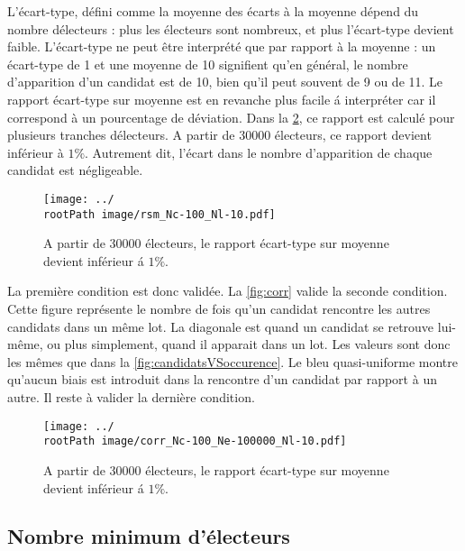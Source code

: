 \documentclass[conference]{IEEEtran}
\newcommand*{\rootPath}{../}
\begin{document}
L'\'ecart-type, d\'efini comme la moyenne des \'ecarts \`a la moyenne d\'epend du nombre d\'electeurs : plus les \'electeurs sont nombreux, et plus l'\'ecart-type devient faible. L'\'ecart-type ne peut \^etre interpr\'et\'e que par rapport \`a la moyenne : un \'ecart-type de 1 et une moyenne de 10 signifient qu'en g\'en\'eral, le nombre d'apparition d'un candidat est de 10, bien qu'il peut souvent de 9 ou de 11. Le rapport \'ecart-type sur moyenne est en revanche plus facile \'a interpr\'eter car il correspond \`a un pourcentage de d\'eviation. Dans la \cref{fig:rem}, ce rapport est calcul\'e pour plusieurs tranches d\'electeurs. A partir de 30000 \'electeurs, ce rapport devient inf\'erieur \`a $1\%$. Autrement dit, l'\'ecart dans le nombre d'apparition de chaque candidat est n\'egligeable.


\begin{figure}[!ht]
  \centering
  \texttt{[image: ../\\rootPath image/rsm\_Nc-100\_Nl-10.pdf]}
  \caption{A partir de 30000 \'electeurs, le rapport \'ecart-type sur moyenne devient inf\'erieur \'a $1\%$.}
  \label{fig:rem}
\end{figure}

La premi\`ere condition est donc valid\'ee. La \cref{fig:corr} valide la seconde condition. Cette figure repr\'esente le nombre de fois qu'un candidat rencontre les autres candidats dans un m\^eme lot. La diagonale est quand un candidat se retrouve lui-m\^eme, ou plus simplement, quand il apparait dans un lot. Les valeurs sont donc les m\^emes que dans la \cref{fig:candidatsVSoccurence}. Le bleu quasi-uniforme montre qu'aucun biais est introduit dans la rencontre d'un candidat par rapport \`a un autre. Il reste \`a valider la derni\`ere condition.


\begin{figure}[!ht]
  \centering
  \texttt{[image: ../\\rootPath image/corr\_Nc-100\_Ne-100000\_Nl-10.pdf]}
  \caption{A partir de 30000 \'electeurs, le rapport \'ecart-type sur moyenne devient inf\'erieur \'a $1\%$.}
  \label{fig:rem}
\end{figure}

\subsection{Nombre minimum d'\'electeurs}
\end{document}
